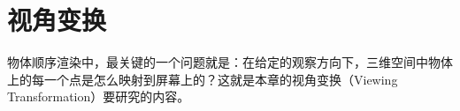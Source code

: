 \chapter{视角变换}

物体顺序渲染中，最关键的一个问题就是：在给定的观察方向下，三维空间中物体上的每一个点是怎么映射到屏幕上的？这就是本章的视角变换（Viewing Transformation）要研究的内容。





